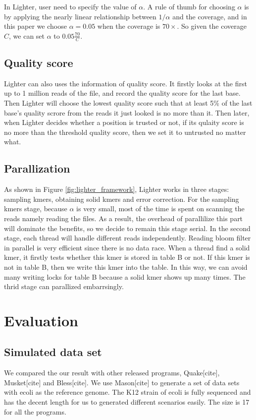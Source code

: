 \documentclass[10pt]{article}
\begin{document}
In Lighter, user need to specify the value of $\alpha$. A rule of thumb for choosing $\alpha$ is by applying the nearly linear relationship between $1/\alpha$ and the coverage, and in this paper we choose $\alpha=0.05$ when the coverage is $70\times$. So given the coverage $C$, we can set $\alpha$ to $0.05\frac{70}{C}$. 

\subsection*{Quality score}
Lighter can also uses the information of quality score. It firstly looks at the first up to 1 million reads of the file, and record the quality score for the last base. Then Lighter will choose the lowest quality score such that at least 5\% of the last base's quality scrore from the reads it just looked is no more than it. Then later, when Lighter decides whether a position is trusted or not, if its qulaity score is no more than the threshold quality score, then we set it to untrusted no matter what.

\subsection*{Parallization} 
As shown in Figure \ref{fig:lighter_framework}, Lighter works in three stages: sampling kmers, obtaining solid kmers and error correction. For the sampling kmers stage, because $\alpha$ is very small, most of the time is spent on scanning the reads namely reading the files. As a result, the overhead of parallilize this part will dominate the benefits, so we decide to remain this stage serial. In the second stage, each thread will handle different reads independently. Reading bloom filter in parallel is very efficient since there is no data race. When a thread find a solid kmer, it firstly tests whether this kmer is stored in table B or not. If this kmer is not in table B, then we write this kmer into the table. In this way, we can avoid many writing locks for table B because a solid kmer shows up many times. The thrid stage can parallized embarrsingly.

\section*{Evaluation}
\subsection*{Simulated data set}
We compared the our result with other released programs, Quake[cite], Musket[cite] and Bless[cite]. We use Mason[cite] to generate a set of data sets with ecoli as the reference genome. The K12 strain of ecoli is fully sequenced and has the decent length for us to generated different scenarios easily. The \kmer size is 17 for all the programs.
\end{document}
